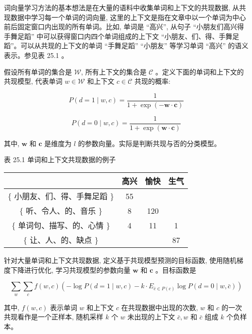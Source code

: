 \documentclass[10pt]{article}
\begin{document}
词向量学习方法的基本想法是在大量的语料中收集单词和上下文的共现数据, 从共现数据中学习每一个单词的词向量, 这里的上下文是指在文章中以一个单词为中心前后固定窗口内出现的所有单词。比如, 单词是 “高兴”, 从句子 “小朋友们高兴得手舞足蹈” 中可以获得窗口内四个单词组成的上下文 “小朋友、们、得、手舞足蹈”。可以从共现的上下文的单词 “手舞足蹈” “小朋友” 等学习单词 “高兴” 的语义表示。参见表 25.1 。

假设所有单词的集合是 $\mathcal{W}$, 所有上下文的集合是 $\mathcal{C}$ 。定义下面的单词和上下文的共现模型, 代表单词 $w \in \mathcal{W}$ 和上下文 $c \in \mathcal{C}$ 共现的概率:


\begin{equation*}
P(d=1 \mid w, c)=\frac{1}{1+\exp (-\boldsymbol{w} \cdot \boldsymbol{c})} \tag{25.39}
\end{equation*}



\begin{equation*}
P(d=0 \mid w, c)=\frac{1}{1+\exp (\boldsymbol{w} \cdot \boldsymbol{c})} \tag{25.40}
\end{equation*}


其中, $\boldsymbol{w}$ 和 $\boldsymbol{c}$ 是维度为 $l$ 的参数向量。实际是判断共现与否的分类模型。

表 25.1 单词和上下文共现数据的例子

\begin{center}
\begin{tabular}{c|c|c|c}
\hline
 & 高兴 & 愉快 & 生气 \\
\hline
$\{$ 小朋友、们、得、手舞足蹈 $\}$ & 55 &  &  \\
\hline
$\{$ 听、令人、的、音乐 $\}$ & 8 & 120 &  \\
\hline
$\{$ 单词句、描写、的、心情 $\}$ & 4 & 11 & 1 \\
\hline
$\{$ 让、人、的、缺点 $\}$ &  &  & 87 \\
\hline
\end{tabular}
\end{center}

针对大量单词和上下文共现数据, 定义基于共现模型预测的目标函数, 使用随机梯度下降进行优化, 学习共现模型的参数向量 $\boldsymbol{w}$ 和 $\boldsymbol{c}$ 。目标函数是


\begin{equation*}
\sum_{w} \sum_{c} f(w, c)\left(-\log P(d=1 \mid w, c)-k \cdot E_{\bar{c} \in P(c)} \log P(d=0 \mid w, \bar{c})\right) \tag{25.41}
\end{equation*}


其中, $f(w, c)$ 表示单词 $w$ 和上下文 $c$ 在共现数据中出现的次数, $w$ 和 $c$ 的一次共现看作是一个正样本, 随机采样 $k$ 个 $w$ 未出现的上下文 $\bar{c}, w$ 和 $\bar{c}$ 组成 $k$ 个负样本。
\end{document}
